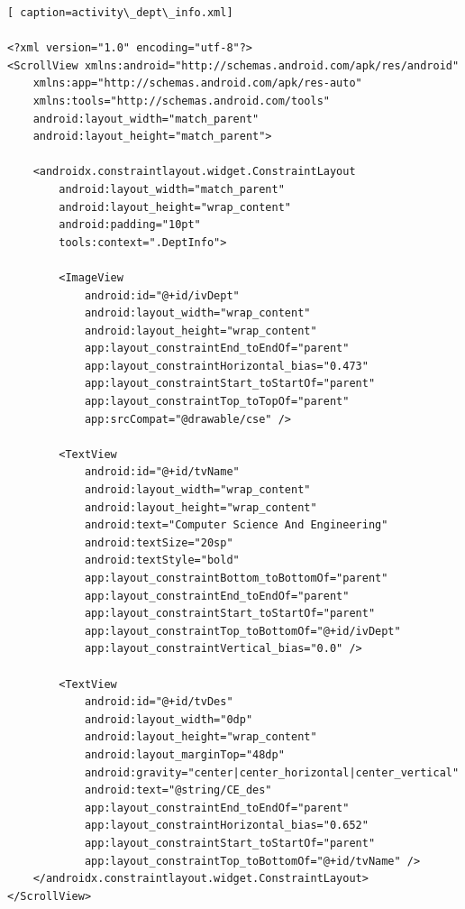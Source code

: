 \documentclass[11pt,a4paper]{report}
\begin{document}
\begin{lstlisting}[ caption=activity\_dept\_info.xml]
  
<?xml version="1.0" encoding="utf-8"?>
<ScrollView xmlns:android="http://schemas.android.com/apk/res/android"
    xmlns:app="http://schemas.android.com/apk/res-auto"
    xmlns:tools="http://schemas.android.com/tools"
    android:layout_width="match_parent"
    android:layout_height="match_parent">

    <androidx.constraintlayout.widget.ConstraintLayout
        android:layout_width="match_parent"
        android:layout_height="wrap_content"
        android:padding="10pt"
        tools:context=".DeptInfo">

        <ImageView
            android:id="@+id/ivDept"
            android:layout_width="wrap_content"
            android:layout_height="wrap_content"
            app:layout_constraintEnd_toEndOf="parent"
            app:layout_constraintHorizontal_bias="0.473"
            app:layout_constraintStart_toStartOf="parent"
            app:layout_constraintTop_toTopOf="parent"
            app:srcCompat="@drawable/cse" />

        <TextView
            android:id="@+id/tvName"
            android:layout_width="wrap_content"
            android:layout_height="wrap_content"
            android:text="Computer Science And Engineering"
            android:textSize="20sp"
            android:textStyle="bold"
            app:layout_constraintBottom_toBottomOf="parent"
            app:layout_constraintEnd_toEndOf="parent"
            app:layout_constraintStart_toStartOf="parent"
            app:layout_constraintTop_toBottomOf="@+id/ivDept"
            app:layout_constraintVertical_bias="0.0" />

        <TextView
            android:id="@+id/tvDes"
            android:layout_width="0dp"
            android:layout_height="wrap_content"
            android:layout_marginTop="48dp"
            android:gravity="center|center_horizontal|center_vertical"
            android:text="@string/CE_des"
            app:layout_constraintEnd_toEndOf="parent"
            app:layout_constraintHorizontal_bias="0.652"
            app:layout_constraintStart_toStartOf="parent"
            app:layout_constraintTop_toBottomOf="@+id/tvName" />
    </androidx.constraintlayout.widget.ConstraintLayout>
</ScrollView>

\end{lstlisting}
\end{document}
